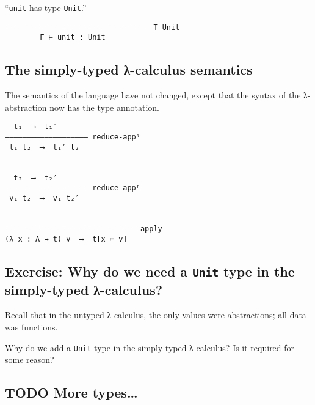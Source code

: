 \documentclass[11pt]{article}
\theoremstyle{definition}
\begin{document}
“\texttt{unit} has type \texttt{Unit}.” 
\begin{verbatim}
––––––––––––––––––––––––––––––––– T-Unit
        Γ ⊢ unit : Unit
\end{verbatim}

\subsection{The simply-typed λ-calculus semantics}
\label{sec:org4e84e72}

The semantics of the language have not changed,
except that the syntax of the λ-abstraction now
has the type annotation.
\begin{verbatim}
  t₁  ⟶  t₁′
––––––––––––––––––– reduce-appˡ
 t₁ t₂  ⟶  t₁′ t₂

 
  t₂  ⟶  t₂′
––––––––––––––––––– reduce-appʳ
 v₁ t₂  ⟶  v₁ t₂′


–––––––––––––––––––––––––––––– apply
(λ x : A → t) v  ⟶  t[x ≔ v]
\end{verbatim}

\subsection{Exercise: Why do we need a \texttt{Unit} type in the simply-typed λ-calculus?}
\label{sec:org5d1adb3}

Recall that in the untyped λ-calculus,
the only values were abstractions; all data was functions.

Why do we add a \texttt{Unit} type in the simply-typed λ-calculus?
Is it required for some reason?

\subsection{{\bfseries\sffamily TODO} More types\ldots{}}
\label{sec:orge1114cb}
\end{document}
